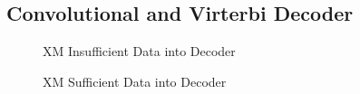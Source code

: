 \documentclass[conference,onecolumn]{IEEEtran}
\begin{document}






\subsection{Convolutional and Virterbi Decoder}

\begin{figure}[H]
	\centerline{}
	\caption{XM Insufficient Data into Decoder}
	\label{fig::Viterbi_1}
\end{figure}
\begin{figure}[H]
	\centerline{}
	\caption{XM Sufficient Data into Decoder}
	\label{fig::Viterbi_2}
\end{figure}
\end{document}
